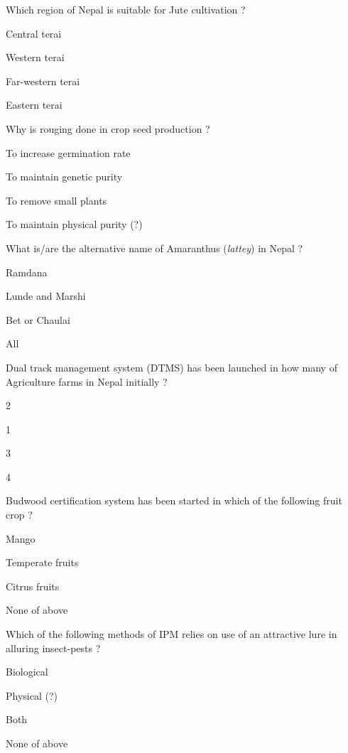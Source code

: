 \begin{questions}
\question Which region of Nepal is suitable for Jute cultivation ?
\begin{items}
\item Central terai
\item Western terai
\item Far-western terai
\item* Eastern terai
\end{items}

\question Why is rouging done in crop seed production ?
\begin{items}
\item To increase germination rate
\item To maintain genetic purity
\item To remove small plants
\item* To maintain physical purity (?)
\end{items}

\question What is/are the alternative name of Amaranthus (\textit{lattey}) in Nepal ?
\begin{items}
\item Ramdana
\item Lunde and Marshi
\item Bet or Chaulai
\item* All
\end{items}

\question Dual track management system (DTMS) has been launched in how many of Agriculture farms in Nepal initially ?
\begin{items}
\item 2
\item 1
\item 3
\item* 4
\end{items}

\question Budwood certification system has been started in which of the following fruit crop ?
\begin{items}
\item Mango
\item Temperate fruits
\item* Citrus fruits
\item None of above
\end{items}

\question Which of the following methods of IPM relies on use of an attractive lure in alluring insect-pests ?
\begin{items}
\item Biological
\item* Physical (?)
\item Both
\item None of above
\end{items}


\end{questions}

